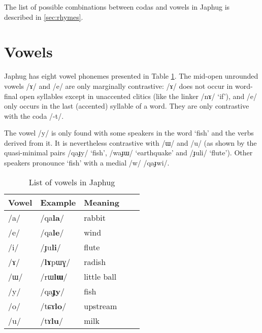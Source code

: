 \documentclass[oneside,a4paper,11pt]{article}
\newcommand{\ipa}[1]{\mbox{\phon/#1/}}
\newcommand{\ipab}[1]{{\phon#1}}
\begin{document}
    
    The list of possible combinations between codas and vowels in Japhug is described in \ref{sec:rhymes}.
    
     \section{Vowels} \label{sec:vowels}
     
     
     Japhug has eight vowel phonemes presented in Table \ref{tab:vowels}. The mid-open unrounded vowels \ipa{ɤ} and \ipa{e} are only marginally contrastive: \ipa{ɤ} does not occur in word-final open syllables except in unaccented clitics (like the linker \ipa{nɤ} `if'), and \ipa{e} only occurs in the last (accented) syllable of a word. They are only contrastive with the coda \ipa{-t}.
     
The vowel \ipa{y} is only found with some speakers in the word `fish' and the verbs derived from it. It is nevertheless contrastive with \ipa{ɯ} and \ipa{u} (as shown by the quasi-minimal pairs \ipa{qaɟy} `fish', \ipa{waɟɯ} `earthquake' and \ipa{ɟuli} `flute'). Other speakers pronounce `fish' with a medial \ipa{w} \ipa{qaɟwi}.
     
     \begin{table}
 \caption{List of vowels in Japhug} \label{tab:vowels}  \centering
     \begin{tabular}{lllll}
     \toprule
Vowel & Example & Meaning \\
\midrule
\ipa{a} &	\ipa{qa\textbf{la}} & rabbit\\
\ipa{e} &	\ipa{qa\textbf{le}} &wind\\
\ipa{i} &	\ipa{ɟu\textbf{li}} &flute\\
\ipa{ɤ} &	\ipa{\textbf{lɤ}pɯɣ} & radish\\
\ipa{ɯ} &	\ipa{rɯ\textbf{lɯ}} &little ball\\
\ipa{y} &	\ipa{qa\textbf{ɟy}} &fish\\
\ipa{o} &	\ipa{tɕɤ\textbf{lo}} &upstream\\
\ipa{u} &	\ipa{tɤ\textbf{lu}} &milk\\
     \bottomrule
     \end{tabular}
     \end{table}
     
     		\begin{vowel}
    		\putcvowel[l]{\ipab{ɤ}}{7}
    		\putcvowel[l]{\ipab{ɯ}}{8}
		\end{vowel}
     
\end{document}
